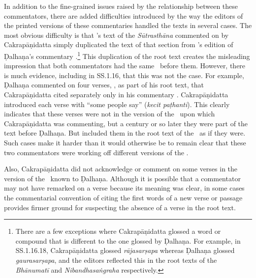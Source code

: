 In addition to the fine-grained issues raised by the relationship between these
commentators, there are added difficulties introduced by the way the editors of
the printed versions of these commentaries handled the texts in several cases. The
most obvious difficulty is that \citeauthor{acar-1939}'s text of the
\emph{Sūtrasthāna} commented on by Cakrapāṇidatta \citep{acar-1939} simply
duplicated the text of that section from \citeauthor{vulgate}'s edition of
Ḍalhaṇa's commentary \citep{vulgate}.\footnote{There are a few exceptions where
Cakrapāṇidatta glossed a word or compound that is different to the one glossed by
Ḍalhaṇa. For example, in SS.1.16.18, Cakrapāṇidatta glossed \emph{rājasarṣapa}
whereas Ḍalhaṇa glossed \emph{gaurasarṣapa}, and the editors reflected this in the
root texts of the \emph{Bhānumatī} \citep[130]{acar-1939} and
\emph{Nibandhasaṅgraha} \citep[79]{vulgate} respectively.} This duplication of the
root text creates the misleading impression that both commentators had the same
\SS\ before them. However, there is much evidence, including in SS.1.16, that this
was not the case. For example, Ḍalhaṇa commented on four verses,
, as part of his root text, that Cakrapāṇidatta cited
separately only in his commentary \citep[128–129]{acar-1939}.  Cakrapāṇidatta
introduced each verse with “some people say” (\emph{kecit paṭhanti}). This clearly
indicates that these verses were not in the version of the \SS\ upon which
Cakrapāṇidatta was commenting, but a century or so later they were part of the
text before Ḍalhaṇa.  But \citeauthor{acar-1939} included them in the root text
of the \SS\ as if they were.  Such cases make it harder than it would otherwise be
to remain clear that these two commentators were working off different versions of
the \SS.

Also, Cakrapāṇidatta did not acknowledge or comment on some verses in the version
of the \SS\ known to Ḍalhaṇa. Although it is possible that a commentator may not
have remarked on a verse because its meaning was clear, in some cases the
commentarial convention of citing the first words of a new verse or passage
provides firmer ground for suspecting the absence of a verse in the root text. 

